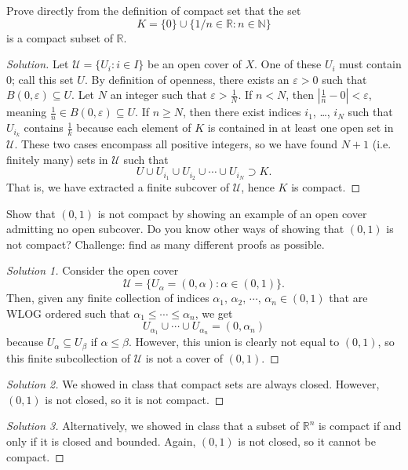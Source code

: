 \documentclass[11pt]{scrartcl}
\providecommand{\eps}{\varepsilon}
\providecommand{\NN}{\mathbb N}
\providecommand{\RR}{\mathbb R}
\newenvironment{soln}{\begin{proof}[Solution]}{\end{proof}}
\providecommand{\abs}[1]{\left|#1\right|}
\begin{document}
\begin{problem}
	Prove directly from the definition of compact set that the set
	\[K = \{0\}\cup\{1/n\in\RR: n\in\NN\}\]
	is a compact subset of $\RR$.
\end{problem}

\begin{soln}
	Let $\mathcal U = \{U_i : i\in I\}$ be an open cover of $X$.
	One of these $U_i$ must contain $0$; call this set $U$.
	By definition of openness, there exists an $\eps > 0$
	such that $B(0, \eps)\subseteq U$. Let $N$ an integer
	such that $\eps > \frac 1N$.
	If $n < N$, then $\abs{\frac 1n - 0} < \eps$, meaning
	$\frac 1n \in B(0,\eps) \subseteq U$.
	If $n \ge N$, then there exist indices $i_1$, \dots, $i_N$
	such that $U_{i_k}$ contains $\frac 1k$
	because each element of $K$ is contained in
	at least one open set in $\mathcal U$.
	These two cases encompass all positive integers, so
	we have found $N+1$ (i.e. finitely many) sets in $\mathcal U$ such that
	\[U\cup U_{i_1} \cup U_{i_2} \cup\cdots\cup U_{i_N} \supset K.\]
	That is, we have extracted a finite subcover of $\mathcal U$,
	hence $K$ is compact.
\end{soln}

\begin{problem}
	Show that $(0,1)$ is not compact by showing an example of
	an open cover admitting no open subcover.
	Do you know other ways of showing that $(0,1)$ is not compact?
	Challenge: find as many different proofs as possible.
\end{problem}

\begin{proof}[Solution 1]
	Consider the open cover
	\[\mathcal U = \{U_\alpha = (0, \alpha) : \alpha\in(0,1)\}.\]
	Then, given any finite collection of indices
	$\alpha_1,\,\alpha_2,\,\cdots,\,\alpha_n\in (0,1)$
	that are WLOG ordered such that $\alpha_1 \le \cdots \le \alpha_n$, we get
	\[U_{\alpha_1}\cup\cdots\cup U_{\alpha_n} = (0, \alpha_n)\]
	because $U_\alpha \subseteq U_\beta$ if $\alpha\le\beta$.
	However, this union is clearly not equal to $(0,1)$,
	so this finite subcollection of $\mathcal U$ is not a cover of $(0,1)$.
\end{proof}

\begin{proof}[Solution 2]
	We showed in class that compact sets are always closed.
	However, $(0,1)$ is not closed, so it is not compact.
\end{proof}

\begin{proof}[Solution 3]
	Alternatively, we showed in class that a subset of $\RR^n$ is compact
	if and only if it is closed and bounded.
	Again, $(0,1)$ is not closed, so it cannot be compact.
\end{proof}
\end{document}
